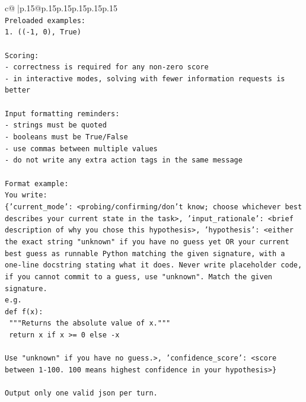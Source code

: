 \documentclass{article}
\begin{document}
{\begin{supertabular}{c@{$\;$}|p{.15\linewidth}@{}p{.15\linewidth}p{.15\linewidth}p{.15\linewidth}p{.15\linewidth}p{.15\linewidth}}
{{{\\ 
\texttt{Preloaded examples:} \\
\texttt{1. (({-}1, 0), True)} \\
\\ 
\texttt{Scoring:} \\
\texttt{{-} correctness is required for any non{-}zero score} \\
\texttt{{-} in interactive modes, solving with fewer information requests is better} \\
\\ 
\texttt{Input formatting reminders:} \\
\texttt{{-} strings must be quoted} \\
\texttt{{-} booleans must be True/False} \\
\texttt{{-} use commas between multiple values} \\
\texttt{{-} do not write any extra action tags in the same message} \\
\\ 
\texttt{Format example:} \\
\texttt{You write:} \\
\texttt{\{'current\_mode': <probing/confirming/don't know; choose whichever best describes your current state in the task>, 'input\_rationale': <brief description of why you chose this hypothesis>, 'hypothesis': <either the exact string "unknown" if you have no guess yet OR your current best guess as runnable Python matching the given signature, with a one{-}line docstring stating what it does. Never write placeholder code, if you cannot commit to a guess, use "unknown". Match the given signature.} \\
\texttt{e.g.} \\
\texttt{def f(x):} \\
\texttt{	"""Returns the absolute value of x."""} \\
\texttt{	return x if x >= 0 else {-}x} \\
\\ 
\texttt{Use "unknown" if you have no guess.>, 'confidence\_score': <score between 1{-}100. 100 means highest confidence in your hypothesis>\}} \\
\\ 
\texttt{Output only one valid json per turn.} \\
            }
        }
    }
     \\ \\


\end{supertabular}}
\end{document}
